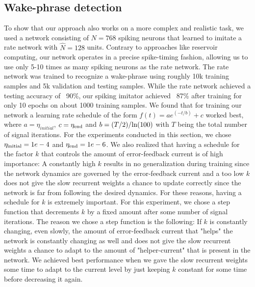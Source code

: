\documentclass[twoside,11pt,titlepage]{article}
\begin{document}
\subsection{Wake-phrase detection}
To show that our approach also works on a more complex and realistic task, we used a network consisting of $N=768$ spiking
neurons that learned to imitate a rate network with $\hat{N}=128$ units. Contrary to approaches like
reservoir computing, our network operates in a precise spike-timing fashion, allowing us to use
only 5-10 times as many spiking neurons as the rate network. The rate network was trained to recognize
a wake-phrase using roughly 10k training samples and 5k validation and testing samples. While the rate network
achieved a testing accuracy of ~90\%, our spiking imitator achieved ~87\% after training for only 10 epochs on about 1000
training samples. We found that for training our network a learning rate schedule of the form $f(t)=a e^{(-t/b)}+c$
worked best, where $a=\eta_{initial}$, $c=\eta_\textnormal{end}$ and $b = (T/2) / \textnormal{ln}(100)$ with $T$ being the
total number of signal iterations. For the experiments conducted in this section, we chose $\eta_\textnormal{initial}=1e-4$ and $\eta_\textnormal{end}=1e-6$.
We also realized that having a schedule for the factor $k$ that controls the amount of error-feedback current is of high importance:
A constantly high $k$ results in no generalization during training since the network dynamics are governed by the error-feedback current and a too low
$k$ does not give the slow recurrent weights a chance to update correctly since the network is far from following the desired dynamics.
For these reasons, having a schedule for $k$ is extremely important. For this experiment, we chose a step function that decrements $k$ by a fixed amount
after some number of signal iterations. The reason we chose a step function is the following: 
If $k$ is constantly changing, even slowly, the amount of error-feedback current that "helps" the network
is constantly changing as well and does not give the slow recurrent weights a chance to adapt to the amount of "helper-current" that is
present in the network. We achieved best performance when we gave the slow recurrent weights some time to adapt to the current level by just
keeping $k$ constant for some time before decreasing it again.
\end{document}
